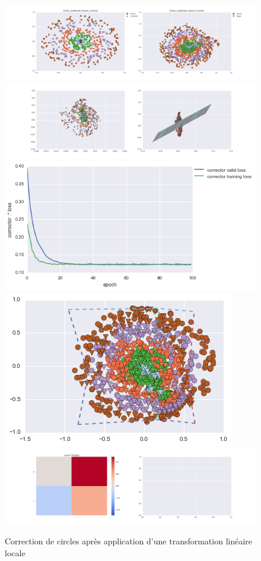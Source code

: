 \begin{figure}[H] %
\centering
\includegraphics[width=\linewidth]{fig/24-05-2016/circles/Circles_GridBendK-closest_Corrector-DATA.png}
\includegraphics[width=\linewidth]{fig/24-05-2016/circles/Circles_GridBendK-closest_Corrector-GridCheck.png}
\includegraphics[width=0.45\linewidth]{fig/24-05-2016/circles/Circles_GridBendK-closest_Corrector-Learning_curve.png}
\includegraphics[width=0.45\linewidth]{fig/24-05-2016/circles/circles_grid.png}
\includegraphics[width=\linewidth]{fig/24-05-2016/circles/Circles_GridBendK-closest_Corrector-W.png}
\caption{Correction de circles après application d'une transformation linéaire locale}
\label{fig:recap-circles-GridBend-exhaustive}
\end{figure}
